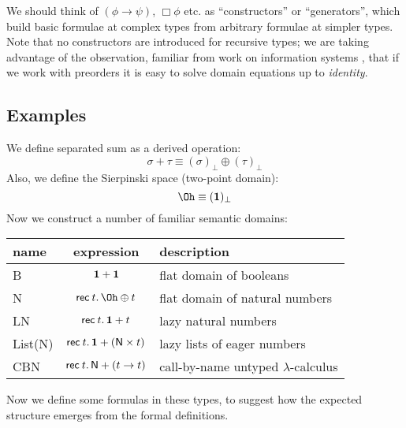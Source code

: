 We should think of $(\phi \rightarrow \psi )$, $\Box \phi$ etc.
as ``constructors'' or ``generators'', which build basic formulae
at complex types from arbitrary formulae at simpler types.
Note that no constructors are introduced for recursive types;
we are taking advantage of the observation, familiar from work on information
systems \cite{LW84}, that if we work with preorders it is easy to solve
domain equations up to {\em identity}.
\subsection*{Examples}
We define separated sum as a derived operation:
\[ \sigma + \tau \equiv (\sigma )_{\bot} \oplus (\tau )_{\bot} \]
Also, we define the Sierpinski space (two-point domain):
\[ \Oh \equiv ({\bf 1})_{\bot} \]
Now we construct a number of familiar semantic domains:
\begin{center}
\begin{tabular}{|l|c|l|} \hline
name &  expression &  description \\ \hline
{\sf B} & ${\bf 1} + {\bf 1}$ & flat domain of booleans \\
{\sf N} & ${\sf rec} \: t. \, \Oh \oplus t$ & flat domain of natural numbers \\
{\sf LN} & ${\sf rec} \: t. \, {\bf 1} + t$ & lazy natural numbers \\
{\sf List(N)} & ${\sf rec} \: t. \, {\bf 1} + ({\sf N} \times t)$ & lazy lists of eager numbers \\
{\sf CBN} & ${\sf rec} \: t. \, {\sf N} + (t \rightarrow t)$ & call-by-name untyped $\lambda$-calculus \\ \hline
\end{tabular}
\end{center}
Now we define some formulas in these types, to suggest how the expected
structure emerges from the formal definitions.
